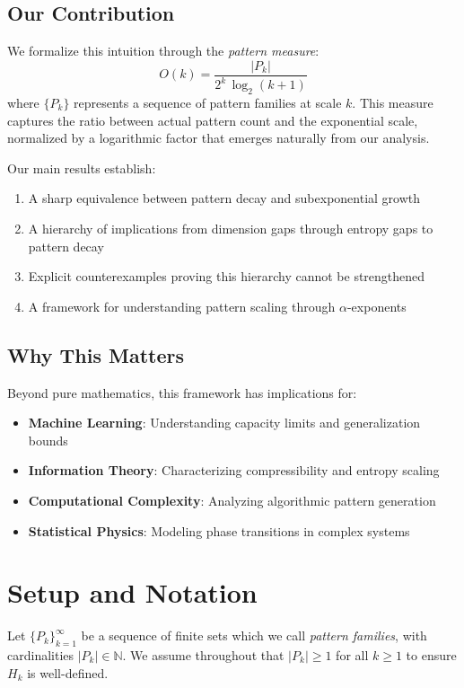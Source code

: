 \documentclass[11pt]{article}
\theoremstyle{definition}
\newcommand{\bbN}{\mathbb{N}}
\begin{document}
\subsection{Our Contribution}

We formalize this intuition through the \emph{pattern measure}:
$$O(k) = \frac{|P_k|}{2^k\,\log_2(k+1)}$$
where $\{P_k\}$ represents a sequence of pattern families at scale $k$. This measure captures the ratio between actual pattern count and the exponential scale, normalized by a logarithmic factor that emerges naturally from our analysis.

Our main results establish:
\begin{enumerate}
\item A sharp equivalence between pattern decay and subexponential growth
\item A hierarchy of implications from dimension gaps through entropy gaps to pattern decay
\item Explicit counterexamples proving this hierarchy cannot be strengthened
\item A framework for understanding pattern scaling through $\alpha$-exponents
\end{enumerate}

\subsection{Why This Matters}

Beyond pure mathematics, this framework has implications for:
\begin{itemize}
\item \textbf{Machine Learning}: Understanding capacity limits and generalization bounds
\item \textbf{Information Theory}: Characterizing compressibility and entropy scaling
\item \textbf{Computational Complexity}: Analyzing algorithmic pattern generation
\item \textbf{Statistical Physics}: Modeling phase transitions in complex systems
\end{itemize}

\section{Setup and Notation}

Let $\{P_k\}_{k=1}^\infty$ be a sequence of finite sets which we call \emph{pattern families}, with cardinalities $|P_k|\in\bbN$. We assume throughout that $|P_k| \geq 1$ for all $k \geq 1$ to ensure $H_k$ is well-defined.
\end{document}

